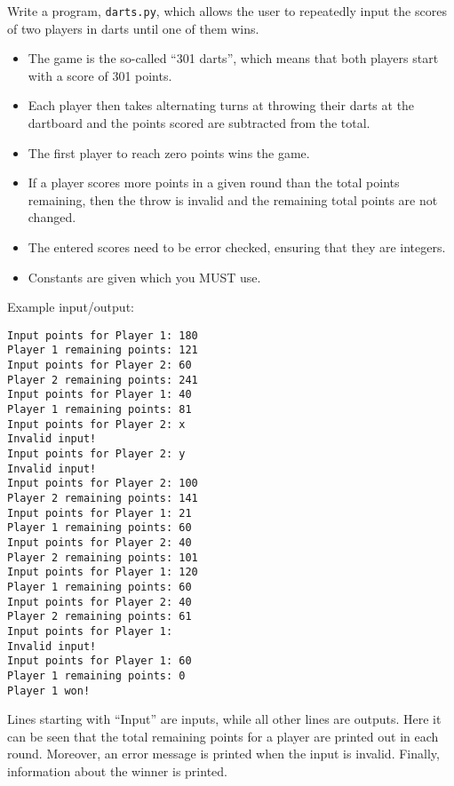 


Write a program, \texttt{darts.py},
which allows the user to repeatedly input the scores of two players in darts
until one of them wins.
\begin{itemize}
    \item
    The game is the so-called ``301 darts'',
    which means that both players start with a score of 301 points.

    \item
    Each player then takes alternating turns
    at throwing their darts at the dartboard
    and the points scored are subtracted from the total.

    \item
    The first player to reach zero points wins the game.

    \item
    If a player scores more points in a given round
    than the total points remaining,
    then the throw is invalid and the remaining total points are not changed.

    \item
    The entered scores need to be error checked,
    ensuring that they are integers.

    \item
    Constants are given which you MUST use.
\end{itemize}

Example input/output:

\begin{verbatim}
Input points for Player 1: 180
Player 1 remaining points: 121
Input points for Player 2: 60
Player 2 remaining points: 241
Input points for Player 1: 40
Player 1 remaining points: 81
Input points for Player 2: x
Invalid input!
Input points for Player 2: y
Invalid input!
Input points for Player 2: 100
Player 2 remaining points: 141
Input points for Player 1: 21
Player 1 remaining points: 60
Input points for Player 2: 40
Player 2 remaining points: 101
Input points for Player 1: 120
Player 1 remaining points: 60
Input points for Player 2: 40
Player 2 remaining points: 61
Input points for Player 1:
Invalid input!
Input points for Player 1: 60
Player 1 remaining points: 0
Player 1 won!
\end{verbatim}

Lines starting with ``Input'' are inputs, while all other lines are outputs.
Here it can be seen that the total remaining points for a player
are printed out in each round.
Moreover, an error message is printed when the input is invalid.
Finally, information about the winner is printed.

